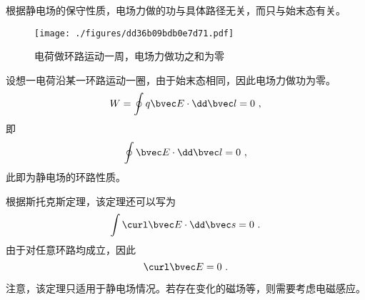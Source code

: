 

根据静电场的保守性质，电场力做的功与具体路径无关，而只与始末态有关。
\begin{figure}[ht]
\centering
\texttt{[image: ./figures/dd36b09bdb0e7d71.pdf]}
\caption{电荷做环路运动一周，电场力做功之和为零} \label{fig_ELECLD_1}
\end{figure}

设想一电荷沿某一环路运动一圈，由于始末态相同，因此电场力做功为零。
$$
W = \oint q\bvec E \cdot \dd \bvec l = 0~,
$$
即
\begin{equation}
\oint \bvec E \cdot \dd \bvec l = 0~,
\end{equation}
此即为静电场的环路性质。

根据斯托克斯定理，该定理还可以写为
$$\int \curl \bvec E \cdot \dd \bvec s = 0~.$$
由于对任意环路均成立，因此
\begin{equation}
\curl \bvec E = 0~.
\end{equation}

注意，该定理只适用于静电场情况。若存在变化的磁场等，则需要考虑电磁感应。
